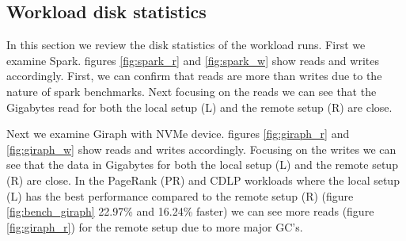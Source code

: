 \subsection{Workload disk statistics}
 In this section we review the disk statistics of the workload runs. First we
 examine Spark. figures \ref{fig:spark_r} and \ref{fig:spark_w} show reads and
 writes accordingly. First, we can confirm that reads are more than writes due to
 the nature of spark benchmarks. Next focusing on the reads we can see that the
 Gigabytes read for both the local setup (L) and the remote setup (R) are close.
 
 Next we examine Giraph with NVMe device. figures \ref{fig:giraph_r} and \ref{fig:giraph_w} show
 reads and writes accordingly. Focusing on the writes we can see that the data
 in Gigabytes for both the local setup (L) and the remote setup (R) are close.
 In the PageRank (PR) and CDLP workloads where the local setup (L) has the
 best performance compared to the remote setup (R) (figure
 \ref{fig:bench_giraph} 22.97\% and 16.24\% faster) we can see more reads
 (figure \ref{fig:giraph_r}) for the remote setup due to more major GC's.

